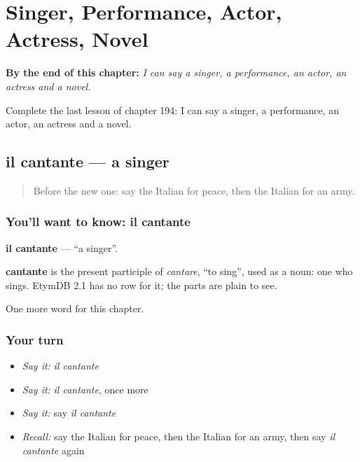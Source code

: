 
\chapter{Singer, Performance, Actor, Actress, Novel}
\label{ch:it-singer-performance-actor-actress-novel}

\begin{chapteropening}
\textbf{By the end of this chapter:} \emph{I can say a singer, a performance, an actor, an actress and a novel.}

Complete the last lesson of chapter 194: I can say a singer, a performance, an actor, an actress and a novel.
\end{chapteropening}

\section[il cantante]{il cantante — a singer}

\label{lesson:IT-C194-cantante}



\begin{quote}
Before the new one: say the Italian for peace, then the Italian for an army.
\end{quote}

\subsection*{You'll want to know: il cantante}
\textbf{il cantante} — \textquotedblleft{}a singer\textquotedblright{}.

\begin{cousinweb}
\textbf{cantante} is the present participle of \emph{cantare}, \textquotedblleft{}to sing\textquotedblright{}, used as a noun: one who sings. EtymDB 2.1 has no row for it; the parts are plain to see.
\end{cousinweb}

\begin{grammarlens}[title={What you've built}]
One more word for this chapter.
\end{grammarlens}

\subsection*{Your turn}
\begin{itemize}
\raggedright
  \item \emph{Say it:} \emph{il cantante}
  \item \emph{Say it:} \emph{il cantante}, once more
  \item \emph{Say it:} say \emph{il cantante}
  \item \emph{Recall:} say the Italian for peace, then the Italian for an army, then say \emph{il cantante} again
\end{itemize}

